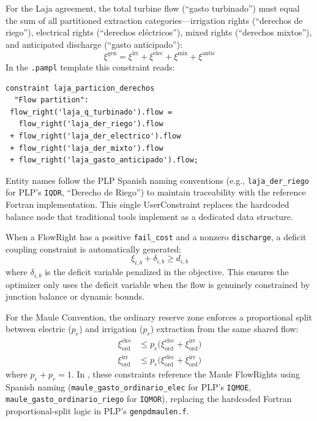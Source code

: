 For the Laja agreement, the total turbine flow (``gasto turbinado'')
must equal the sum of all partitioned extraction categories---irrigation
rights (``derechos de riego''), electrical rights (``derechos
el\'ectricos''), mixed rights (``derechos mixtos''), and anticipated
discharge (``gasto anticipado''):
\begin{equation}
\label{eq:uc_partition}
\xi^\text{gen} = \xi^\text{irr} + \xi^\text{elec}
  + \xi^\text{mix} + \xi^\text{antic}
\end{equation}
In the \texttt{.pampl} template this constraint reads:
{\footnotesize
\begin{verbatim}
constraint laja_particion_derechos
  "Flow partition":
 flow_right('laja_q_turbinado').flow =
   flow_right('laja_der_riego').flow
 + flow_right('laja_der_electrico').flow
 + flow_right('laja_der_mixto').flow
 + flow_right('laja_gasto_anticipado').flow;
\end{verbatim}
}

Entity names follow the PLP Spanish naming conventions (e.g.,
\texttt{laja\_der\_riego} for PLP's \texttt{IQDR}, ``Derecho de
Riego'') to maintain traceability with the reference Fortran
implementation.  This single UserConstraint replaces the hardcoded
balance node that traditional tools implement as a dedicated data
structure.

When a FlowRight has a positive \texttt{fail\_cost} and a nonzero
\texttt{discharge}, a deficit coupling constraint is automatically
generated:
\begin{equation}
\label{eq:deficit_coupling}
\xi_{i,b} + \delta_{i,b} \geq d_{i,b}
\end{equation}
where $\delta_{i,b}$ is the deficit variable penalized in the
objective.  This ensures the optimizer only uses the deficit
variable when the flow is genuinely constrained by junction
balance or dynamic bounds.

For the Maule Convention, the ordinary reserve zone enforces a
proportional split between electric ($p_e$) and irrigation ($p_r$)
extraction from the same shared flow:
\begin{align}
\label{eq:uc_maule_pct}
\xi^\text{elec}_\text{ord} &\leq
  p_e \bigl(\xi^\text{elec}_\text{ord} + \xi^\text{irr}_\text{ord}\bigr) \\
\xi^\text{irr}_\text{ord}  &\leq
  p_r \bigl(\xi^\text{elec}_\text{ord} + \xi^\text{irr}_\text{ord}\bigr)
\end{align}
where $p_e + p_r = 1$.  In \gtopt{}, these constraints reference the
Maule FlowRights using Spanish naming
(\texttt{maule\_gasto\_ordinario\_elec} for PLP's \texttt{IQMOE},
\texttt{maule\_gasto\_ordinario\_riego} for \texttt{IQMOR}),
replacing the hardcoded Fortran proportional-split logic in PLP's
\texttt{genpdmaulen.f}.

